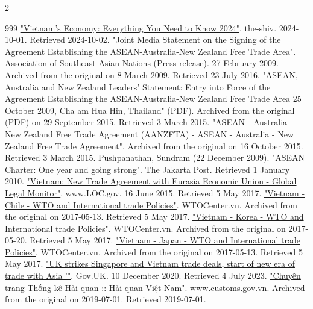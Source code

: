\documentclass[openany]{book}
\begin{document}
\begin{multicols}{2}
\begin{thebibliography}{999}
 \href{https://the-shiv.com/vietnams-economy/#Foreign_Direct_Investment}{"Vietnam's Economy: Everything You Need to Know 2024"}. the-shiv. 2024-10-01. Retrieved 2024-10-02.
 "Joint Media Statement on the Signing of the Agreement Establishing the ASEAN-Australia-New Zealand Free Trade Area". Association of Southeast Asian Nations (Press release). 27 February 2009. Archived from the original on 8 March 2009. Retrieved 23 July 2016.
 "ASEAN, Australia and New Zealand Leaders' Statement: Entry into Force of the Agreement Establishing the ASEAN-Australia-New Zealand Free Trade Area 25 October 2009, Cha am Hua Hin, Thailand" (PDF). Archived from the original (PDF) on 29 September 2015. Retrieved 3 March 2015.
 "ASEAN - Australia - New Zealand Free Trade Agreement (AANZFTA) - ASEAN - Australia - New Zealand Free Trade Agreement". Archived from the original on 16 October 2015. Retrieved 3 March 2015.
 Pushpanathan, Sundram (22 December 2009). "ASEAN Charter: One year and going strong". The Jakarta Post. Retrieved 1 January 2010.
 \href{https://www.loc.gov/law/foreign-news/article/vietnam-new-trade-agreement-with-eurasia-economic-union/}{"Vietnam: New Trade Agreement with Eurasia Economic Union - Global Legal Monitor"}. www.LOC.gov. 16 June 2015. Retrieved 5 May 2017.
 \href{https://web.archive.org/web/20170513212731/http://wtocenter.vn/fta/concluded/vietnam-chile}{"Vietnam - Chile - WTO and International trade Policies"}. WTOCenter.vn. Archived from the original on 2017-05-13. Retrieved 5 May 2017.
 \href{https://web.archive.org/web/20170520075539/http://wtocenter.vn/fta/negotiations/vietnam-korea}{"Vietnam - Korea - WTO and International trade Policies"}. WTOCenter.vn. Archived from the original on 2017-05-20. Retrieved 5 May 2017.
 \href{https://web.archive.org/web/20170513212740/http://wtocenter.vn/fta/concluded/vietnam-japan}{"Vietnam - Japan - WTO and International trade Policies"}. WTOCenter.vn. Archived from the original on 2017-05-13. Retrieved 5 May 2017.
 \href{https://www.gov.uk/government/news/uk-strikes-singapore-and-vietnam-trade-deals-start-of-new-era-of-trade-with-asia}{"UK strikes Singapore and Vietnam trade deals, start of new era of trade with Asia '"}. Gov.UK. 10 December 2020. Retrieved 4 July 2023.
 \href{https://web.archive.org/web/20190701033851/https://www.customs.gov.vn/Lists/ThongKeHaiQuan/Default.aspx}{"Chuyên trang Thống kê Hải quan :: Hải quan Việt Nam"}. www.customs.gov.vn. Archived from the original on 2019-07-01. Retrieved 2019-07-01.

\end{thebibliography}
\end{multicols}
\end{document}

